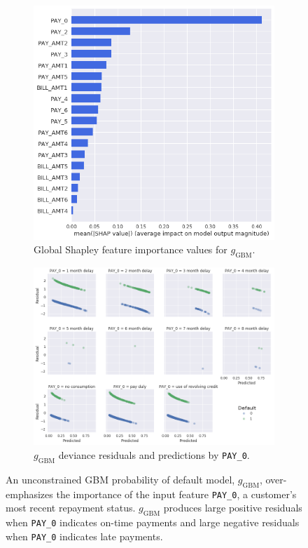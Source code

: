 \documentclass[fleqn]{article}
\begin{document}
\begin{itemize}
\begin{figure}
\begin{subfigure}{.5\textwidth}
  \includegraphics[width=.84\linewidth]{img/figure_2a.png}
  \caption{Global Shapley feature importance values for $g_{\text{GBM}}$.}
  \label{fig:2a}
\end{subfigure}%
\begin{subfigure}{.5\textwidth}
  \centering
  \includegraphics[width=1.1\linewidth]{img/figure_2b.png}
  \caption{$g_{\text{GBM}}$ deviance residuals and predictions by \texttt{PAY\_0}.}
  \label{fig:2b}
\end{subfigure}
\label{fig:figure_2}
\caption{An unconstrained GBM probability of default model, $g_{\text{GBM}}$, over-emphasizes the importance of the input feature \texttt{PAY\_0}, a customer's most recent repayment status. $g_{\text{GBM}}$ produces large positive residuals when \texttt{PAY\_0} indicates on-time payments and large negative residuals when \texttt{PAY\_0} indicates late payments.}
\label{fig:figure_2}
\end{figure}


\end{itemize}
\end{document}

